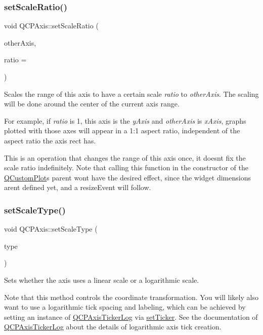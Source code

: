 \subsubsection{\texorpdfstring{setScaleRatio()}{setScaleRatio()}}
{\footnotesize\ttfamily void Q\+C\+P\+Axis\+::set\+Scale\+Ratio (\begin{DoxyParamCaption}\item[{const \mbox{\hyperlink{class_q_c_p_axis}{Q\+C\+P\+Axis}} $\ast$}]{other\+Axis,  }\item[{double}]{ratio = {} }\end{DoxyParamCaption})}

Scales the range of this axis to have a certain scale {\itshape ratio} to {\itshape other\+Axis}. The scaling will be done around the center of the current axis range.

For example, if {\itshape ratio} is 1, this axis is the {\itshape y\+Axis} and {\itshape other\+Axis} is {\itshape x\+Axis}, graphs plotted with those axes will appear in a 1\+:1 aspect ratio, independent of the aspect ratio the axis rect has.

This is an operation that changes the range of this axis once, it doesn\textquotesingle{}t fix the scale ratio indefinitely. Note that calling this function in the constructor of the \mbox{\hyperlink{class_q_custom_plot}{Q\+Custom\+Plot}}\textquotesingle{}s parent won\textquotesingle{}t have the desired effect, since the widget dimensions aren\textquotesingle{}t defined yet, and a resize\+Event will follow. \mbox{\label{class_q_c_p_axis_adef29cae617af4f519f6c40d1a866ca6}} 
\subsubsection{\texorpdfstring{setScaleType()}{setScaleType()}}
{\footnotesize\ttfamily void Q\+C\+P\+Axis\+::set\+Scale\+Type (\begin{DoxyParamCaption}\item[{\mbox{\hyperlink{class_q_c_p_axis_a36d8e8658dbaa179bf2aeb973db2d6f0}{Q\+C\+P\+Axis\+::\+Scale\+Type}}}]{type }\end{DoxyParamCaption})}

Sets whether the axis uses a linear scale or a logarithmic scale.

Note that this method controls the coordinate transformation. You will likely also want to use a logarithmic tick spacing and labeling, which can be achieved by setting an instance of \mbox{\hyperlink{class_q_c_p_axis_ticker_log}{Q\+C\+P\+Axis\+Ticker\+Log}} via \mbox{\hyperlink{class_q_c_p_axis_a4ee03fcd2c74d05cd1a419b9af5cfbdc}{set\+Ticker}}. See the documentation of \mbox{\hyperlink{class_q_c_p_axis_ticker_log}{Q\+C\+P\+Axis\+Ticker\+Log}} about the details of logarithmic axis tick creation.

